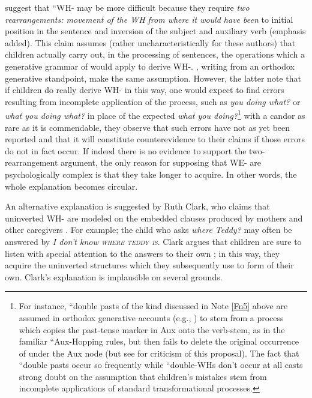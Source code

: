 \citet[354]{ClarkEtAl1977} suggest that ``WH- may be more difficult because they require \textit{two rearrangements: movement of the WH from where it would have been} to initial position in the sentence and inversion of the subject and auxiliary verb (emphasis added). This claim assumes (rather uncharacteristically for these authors) that children actually carry out, in the processing of sentences, the operations which a generative grammar of  would apply to derive WH-. \citet{ErreichEtAl1980}, writing from an orthodox generative standpoint, make the same assumption. However, the latter note that if children do really derive WH- in this way, one would expect to find errors resulting from incomplete application of the process, such as \textit{you doing what?} or \textit{what you doing what?} in place of the expected \textit{what you doing?}\footnote{For instance, ``double pasts of the kind discussed in Note \ref{Fn5} above are assumed in orthodox generative accounts (e.g., \citealt{Hurford1975}) to stem from a process which copies the past-tense marker in Aux onto the verb-stem, as in the familiar ``Aux-Hopping rules, but then fails to delete the original occurrence of  under the Aux node (but see \citet{MaratsosEtAl1978} for criticism of this proposal). The fact that ``double pasts occur so frequently while ``double-WHs don't occur at all casts strong doubt on the assumption that children's mistakes stem from incomplete applications of standard transformational processes.} with a candor as rare as it is commendable, they observe that such errors have not as yet been reported and that it will constitute counterevidence to their claims if those errors do not in fact occur. If indeed there is no evidence to support the two-rearrangement argument, the only reason for supposing that WE- are psychologically complex is that they take longer to acquire. In other words, the whole explanation becomes circular.

An alternative explanation is suggested by Ruth Clark, who claims that uninverted WH- are modeled on the embedded clauses produced by mothers and other caregivers \citep{Clark1977}. For example; the child who asks \textit{where Teddy?} may often be answered by \textit{I don't know \textsc{where teddy is}}. Clark argues that children are sure to listen with special attention to the answers to their own ; in this way, they acquire the uninverted structures which they subsequently use to form  of their own. Clark's explanation is implausible on several grounds.

